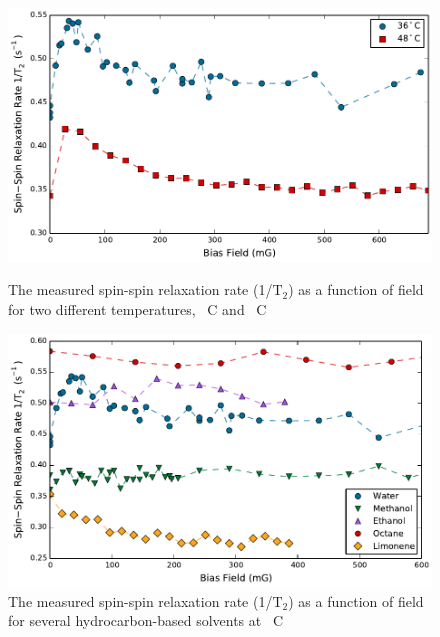 \documentclass[PaulGanssle-Thesis.tex]{subfiles}
\begin{document}
\begin{figure}[ht!]
\centering
\begin{minipage}[t]{0.45\tw}
\centering
    \includegraphics[width=\textwidth]{figures/relaxometry/water-relaxation-t2temp.pdf}
    \caption{The measured spin-spin relaxation rate (1/$\mathrm{T}_{2}$) as a function of field for two different temperatures, \unit[36]{\degsym C} and \unit[48]{\degsym C}}
    \label{fig:LowFieldRelaxation-WaterT2Temp-Data}
\end{minipage}
\hspace{0.01cm}
\begin{minipage}[t]{0.45\tw}
\centering
    \includegraphics[width=\textwidth]{figures/relaxometry/solvent-relaxation-t2f.pdf}
    \caption{The measured spin-spin relaxation rate (1/$\mathrm{T}_{2}$) as a function of field for several hydrocarbon-based solvents at \unit[36]{\degsym C}}
    \label{fig:LowFieldRelaxation-Solvents-Data}
\end{minipage}
\end{figure}
\end{document}
